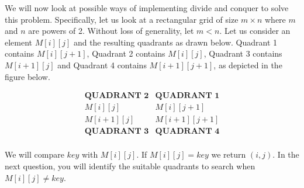 \documentclass[11pt]{article}
\begin{document}
We will now look at possible ways of implementing divide and conquer to solve this problem. Specifically, let us look at a rectangular grid of size \(m \times n\) where \(m\) and \(n\) are powers of 2. Without loss of generality, let \(m < n\). Let us consider an element \(M[i][j]\) and the resulting quadrants as drawn below. Quadrant 1 contains \(M[i][j + 1]\), Quadrant 2 contains \(M[i][j]\), Quadrant 3 contains \(M[i + 1][j]\) and Quadrant 4 contains \(M[i + 1][j + 1]\), as depicted in the figure below.

\[
\begin{array}{c|c}
  \textbf{QUADRANT 2} & \textbf{QUADRANT 1} \\
  M[i][j] & M[i][j+1] \\
  \hline
  M[i+1][j] & M[i+1][j+1] \\
  \textbf{QUADRANT 3} & \textbf{QUADRANT 4} \\
\end{array}
\]

We will compare \(key\) with \(M[i][j]\). If \(M[i][j] = key\) we return \((i, j)\). In the next question, you will identify the suitable quadrants to search when \(M[i][j] \neq key\).
\end{document}
